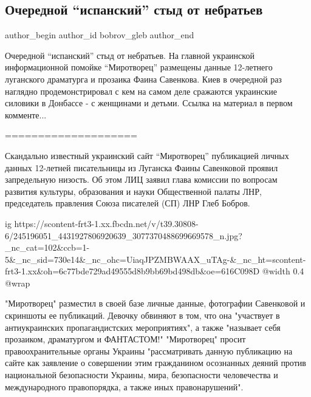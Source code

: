  
 
 
 
 
 
\subsection{Очередной \enquote{испанский} стыд от небратьев}
\label{sec:13_10_2021.fb.bobrov_gleb.1.savenkova_mirotvorec}
 
\ifcmt
 author_begin
   author_id bobrov_gleb
 author_end
\fi

Очередной \enquote{испанский} стыд от небратьев. На главной украинской информационной
помойке \enquote{Миротворец} размещены данные 12-летнего луганского драматурга и
прозаика Фаина Савенкова. Киев в очередной раз наглядно продемонстрировал с кем
на самом деле сражаются украинские силовики в Донбассе - с женщинами и детьми.
Ссылка на материал в первом комменте...

====================

Скандально известный украинский сайт \enquote{Миротворец} публикацией личных данных
12-летней писательницы из Луганска Фаины Савенковой проявил запредельную
низость. Об этом ЛИЦ заявил глава комиссии по вопросам развития культуры,
образования и науки Общественной палаты ЛНР, председатель правления Союза
писателей (СП) ЛНР Глеб Бобров.

\ifcmt
  ig https://scontent-frt3-1.xx.fbcdn.net/v/t39.30808-6/245196051_4431927806920639_3077370488699669578_n.jpg?_nc_cat=102&ccb=1-5&_nc_sid=730e14&_nc_ohc=UiaqJPZMBWAAX_uTAg-&_nc_ht=scontent-frt3-1.xx&oh=6c77bde729ad49555d8b9bb69bd498db&oe=616C098D
  @width 0.4
  @wrap 
\fi

"Миротворец" разместил в своей базе личные данные, фотографии Савенковой и
скриншоты ее публикаций. Девочку обвиняют в том, что она "участвует в
антиукраинских пропагандистских мероприятиях", а также "называет себя
прозаиком, драматургом и ФАНТАСТОМ!" "Миротворец" просит правоохранительные
органы Украины "рассматривать данную публикацию на сайте как заявление о
совершении этим гражданином осознанных деяний против национальной безопасности
Украины, мира, безопасности человечества и международного правопорядка, а также
иных правонарушений".

